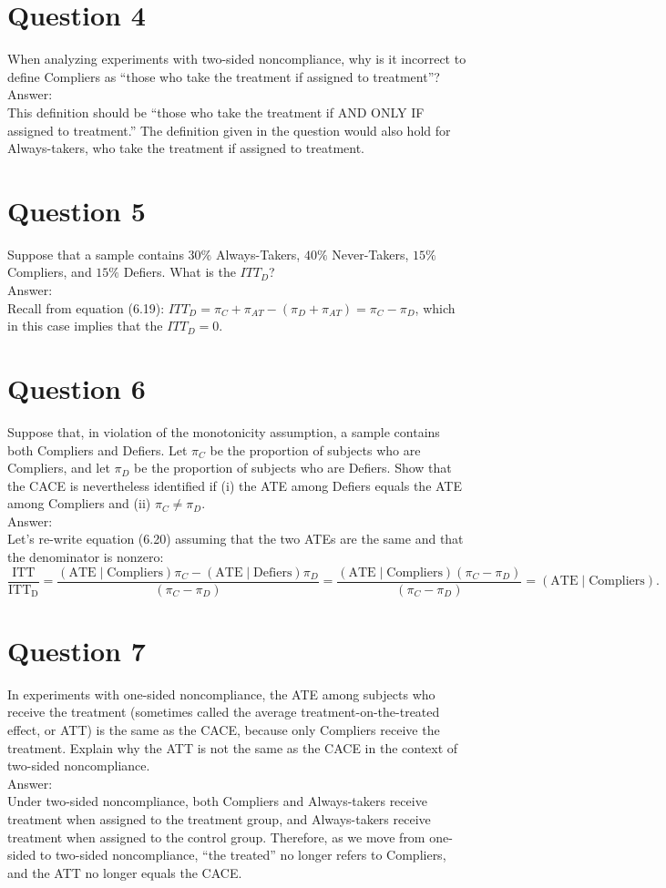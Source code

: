 \documentclass[11pt,notitlepage]{article}\usepackage[]{graphicx}\usepackage[]{color}
\begin{document}
\section*{Question 4}
When analyzing experiments with two-sided noncompliance, why is it incorrect to define Compliers as ``those who take the treatment if assigned to treatment''? \\
Answer:\\
This definition should be ``those who take the treatment if AND ONLY IF assigned to treatment.''  The definition given in the question would also hold for Always-takers, who take the treatment if assigned to treatment.

\section*{Question 5}
Suppose that a sample contains $30\%$ Always-Takers, $40\%$ Never-Takers, $15\%$ Compliers, and $15\%$ Defiers. What is the $ITT_D$? \\
Answer:\\
Recall from equation (6.19): $ITT_D= \pi_{C}+ \pi_{AT}- (\pi_{D} + \pi_{AT}) = \pi_{C}- \pi_{D}$, which in this case implies that the $ITT_D = 0$.

\section*{Question 6}
Suppose that, in violation of the monotonicity assumption, a sample contains both Compliers and Defiers. Let $\pi_C$ be the proportion of subjects who are Compliers, and let $\pi_D$ be the proportion of subjects who are Defiers. Show that the CACE is nevertheless identified if (i) the ATE among Defiers equals the ATE among Compliers and (ii) $\pi_C \neq \pi_D$.\\
Answer:\\
Let's re-write equation (6.20) assuming that the two ATEs are the same and that the denominator is nonzero:
\begin{equation*}
\frac{\mathrm{ITT}}{\mathrm{ITT_D}} =\frac{\mathrm{(ATE\mid Compliers)} \pi_C-\mathrm{(ATE\mid Defiers)}\pi_D}{(\pi_C-\pi_D )}=\frac{\mathrm{(ATE\mid Compliers)} (\pi_C- \pi_D)}{(\pi_C-\pi_D)}=\mathrm{(ATE\mid Compliers)}.
\end{equation*}

\section*{Question 7}
In experiments with one-sided noncompliance, the ATE among subjects who receive the treatment (sometimes called the average treatment-on-the-treated effect, or ATT) is the same as the CACE, because only Compliers receive the treatment. Explain why the ATT is not the same as the CACE in the context of two-sided noncompliance.\\
Answer:\\
Under two-sided noncompliance, both Compliers and Always-takers receive treatment when assigned to the treatment group, and Always-takers receive treatment when assigned to the control group. Therefore, as we move from one-sided to two-sided noncompliance, ``the treated'' no longer refers to Compliers, and the ATT no longer equals the CACE.
\end{document}
